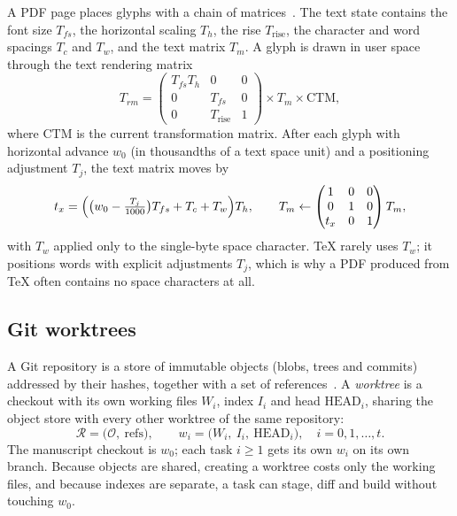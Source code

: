 A PDF page places glyphs with a chain of matrices~\cite{iso32000}. The text
state contains the font size $T_{fs}$, the horizontal scaling $T_h$, the rise
$T_{\text{rise}}$, the character and word spacings $T_c$ and $T_w$, and the
text matrix $T_m$. A glyph is drawn in user space through the text rendering
matrix
\begin{equation}
  T_{rm} =
  \begin{pmatrix}
    T_{fs} T_h & 0 & 0 \\
    0 & T_{fs} & 0 \\
    0 & T_{\text{rise}} & 1
  \end{pmatrix}
  \times T_m \times \mathrm{CTM},
  \label{eq:trm}
\end{equation}
where $\mathrm{CTM}$ is the current transformation matrix. After each glyph
with horizontal advance $w_0$ (in thousandths of a text space unit) and a
positioning adjustment $T_j$, the text matrix moves by
\begin{equation}
  t_x = \Bigl( \bigl(w_0 - \tfrac{T_j}{1000}\bigr) T_{fs} + T_c + T_w \Bigr) T_h ,
  \qquad
  T_m \leftarrow
  \begin{pmatrix} 1 & 0 & 0 \\ 0 & 1 & 0 \\ t_x & 0 & 1 \end{pmatrix} T_m ,
  \label{eq:advance}
\end{equation}
with $T_w$ applied only to the single-byte space character. \TeX{} rarely uses
$T_w$; it positions words with explicit adjustments $T_j$, which is why a PDF
produced from \TeX{} often contains no space characters at all.

\subsection{Git worktrees}

A Git repository is a store of immutable objects (blobs, trees and commits)
addressed by their hashes, together with a set of references~\cite{chacon2014}.
A \emph{worktree} is a checkout with its own working files $W_i$, index $I_i$
and head $\mathrm{HEAD}_i$, sharing the object store with every other worktree
of the same repository:
\begin{equation}
  \mathcal{R} = \bigl(\mathcal{O},\ \mathrm{refs}\bigr), \qquad
  w_i = \bigl(W_i,\ I_i,\ \mathrm{HEAD}_i\bigr), \quad i = 0, 1, \dots, t .
\end{equation}
The manuscript checkout is $w_0$; each task $i \ge 1$ gets its own $w_i$ on its
own branch. Because objects are shared, creating a worktree costs only the
working files, and because indexes are separate, a task can stage, diff and
build without touching $w_0$.

